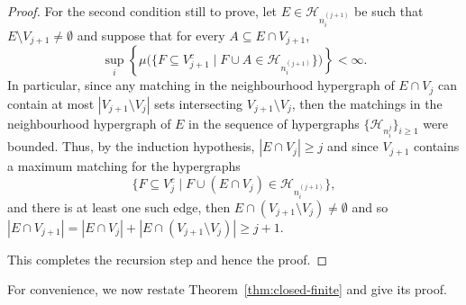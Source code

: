 \documentclass[11pt,reqno]{amsart}
\theoremstyle{definition}
\begin{document}
\begin{proof}
For the second condition still to prove, let $E \in \mathcal{H}_{n_i^{(j+1)}}$ be such that $E \setminus V_{j+1} \neq \emptyset$ and suppose that for every $A \subseteq E \cap V_{j+1}$,
\[
 \sup_i \left\{ \mu\big(\{F \subseteq V_{j+1}^c \mid F\cup A \in \mathcal{H}_{n_i^{(j+1)}}\}\big)\right\} < \infty.
\]
In particular, since any matching in the neighbourhood hypergraph of $E \cap V_j$ can contain at most $|V_{j+1} \setminus V_j|$ sets intersecting $V_{j+1} \setminus V_j$, then the matchings in the neighbourhood hypergraph of $E$ in the sequence of hypergraphs $\{\mathcal{H}_{n_i^{j}}\}_{i \geq 1}$ were bounded.  Thus, by the induction hypothesis, $|E \cap V_j| \geq j$ and since $V_{j+1}$ contains a maximum matching for the hypergraphs
\[
 \{F \subseteq V_j^c \mid F \cup (E \cap V_{j}) \in \mathcal{H}_{n_i^{(j+1)}}\},
\]
and there is at least one such edge, then $E \cap (V_{j+1} \setminus V_j) \neq \emptyset$ and so $|E \cap V_{j+1}| = |E \cap V_j| + |E \cap (V_{j+1} \setminus V_j)| \geq j+1$.

This completes the recursion step and hence the proof.
\end{proof}

For convenience, we now restate Theorem~\ref{thm:closed-finite} and give its proof.
\end{document}

